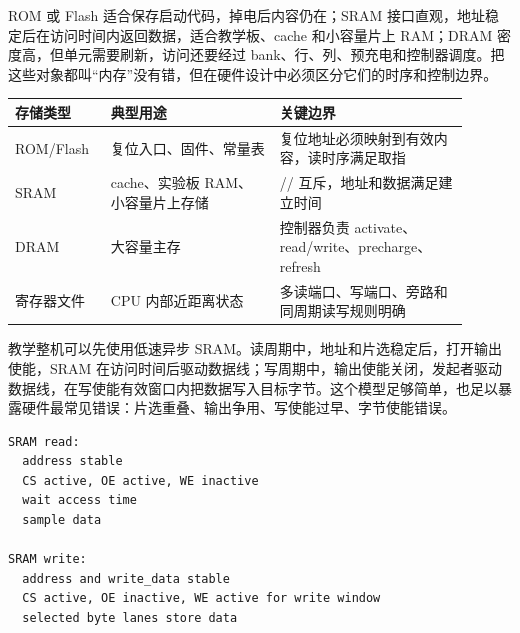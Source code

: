 ROM 或 Flash 适合保存启动代码，掉电后内容仍在；SRAM 接口直观，地址稳定后在访问时间内返回数据，适合教学板、cache 和小容量片上 RAM；DRAM 密度高，但单元需要刷新，访问还要经过 bank、行、列、预充电和控制器调度。把这些对象都叫“内存”没有错，但在硬件设计中必须区分它们的时序和控制边界。

\begin{longtable}{L{0.18\linewidth}L{0.34\linewidth}L{0.38\linewidth}}
\toprule
存储类型 & 典型用途 & 关键边界 \\
\midrule
ROM/Flash & 复位入口、固件、常量表 & 复位地址必须映射到有效内容，读时序满足取指 \\
SRAM & cache、实验板 RAM、小容量片上存储 & // 互斥，地址和数据满足建立时间 \\
DRAM & 大容量主存 & 控制器负责 activate、read/write、precharge、refresh \\
寄存器文件 & CPU 内部近距离状态 & 多读端口、写端口、旁路和同周期读写规则明确 \\
\bottomrule
\end{longtable}

教学整机可以先使用低速异步 SRAM。读周期中，地址和片选稳定后，打开输出使能，SRAM 在访问时间后驱动数据线；写周期中，输出使能关闭，发起者驱动数据线，在写使能有效窗口内把数据写入目标字节。这个模型足够简单，也足以暴露硬件最常见错误：片选重叠、输出争用、写使能过早、字节使能错误。

\begin{lstlisting}
SRAM read:
  address stable
  CS active, OE active, WE inactive
  wait access time
  sample data

SRAM write:
  address and write_data stable
  CS active, OE inactive, WE active for write window
  selected byte lanes store data
\end{lstlisting}

